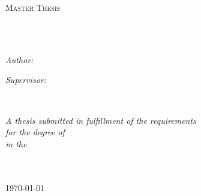 \documentclass[
12pt, %
english, %
doublespacing, %
headsepline, %
]{MastersDoctoralThesis} %
\author{John \textsc{Smith}} %
\begin{document}
\frontmatter %

\pagestyle{plain} %


\begin{titlepage}
\begin{center}

\vspace*{.06\textheight}
{\scshape\LARGE \univname\par}\vspace{1.5cm} %
\textsc{\Large Master Thesis}\\[0.5cm] %

\HRule \\[0.4cm] %
{\huge \bfseries \ttitle\par}\vspace{0.4cm} %
\HRule \\[1.5cm] %
 
\begin{minipage}[t]{0.4\textwidth}
\begin{flushleft} \large
\emph{Author:}\\
\href{http://www.johnsmith.com}{\authorname} %
\end{flushleft}
\end{minipage}
\begin{minipage}[t]{0.4\textwidth}
\begin{flushright} \large
\emph{Supervisor:} \\
\href{http://www.jamessmith.com}{\supname} %
\end{flushright}
\end{minipage}\\[3cm]
 
\vfill

\large \textit{A thesis submitted in fulfillment of the requirements\\ for the degree of \degreename}\\[0.3cm] %
\textit{in the}\\[0.4cm]
\groupname\\\deptname\\[2cm] %
 
\vfill

{\large \today}\\[4cm] %
 
\vfill
\end{center}
\end{titlepage}
\end{document}
